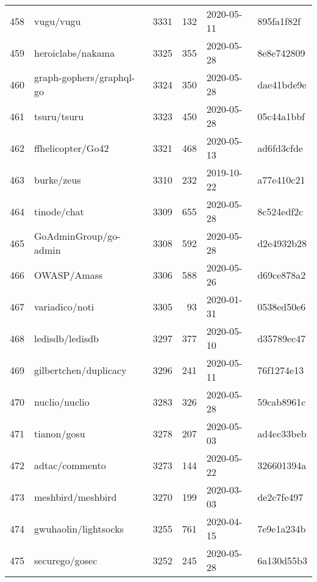 \begin{longtable}{llrrll}
    458 &                                          vugu/vugu &   3331 &    132 & 2020-05-11 &  895fa1f82f \\
    459 &                                  heroiclabs/nakama &   3325 &    355 & 2020-05-28 &  8e8e742809 \\
    460 &                           graph-gophers/graphql-go &   3324 &    350 & 2020-05-28 &  dae41bde9e \\
    461 &                                        tsuru/tsuru &   3323 &    450 & 2020-05-28 &  05c44a1bbf \\
    462 &                                  ffhelicopter/Go42 &   3321 &    468 & 2020-05-13 &  ad6fd3cfde \\
    463 &                                         burke/zeus &   3310 &    232 & 2019-10-22 &  a77e410c21 \\
    464 &                                        tinode/chat &   3309 &    655 & 2020-05-28 &  8c524edf2c \\
    465 &                              GoAdminGroup/go-admin &   3308 &    592 & 2020-05-28 &  d2e4932b28 \\
    466 &                                        OWASP/Amass &   3306 &    588 & 2020-05-26 &  d69ce878a2 \\
    467 &                                     variadico/noti &   3305 &     93 & 2020-01-31 &  0538ed50e6 \\
    468 &                                    ledisdb/ledisdb &   3297 &    377 & 2020-05-10 &  d35789ec47 \\
    469 &                              gilbertchen/duplicacy &   3296 &    241 & 2020-05-11 &  76f1274e13 \\
    470 &                                      nuclio/nuclio &   3283 &    326 & 2020-05-28 &  59cab8961c \\
    471 &                                        tianon/gosu &   3278 &    207 & 2020-05-03 &  ad4ec33beb \\
    472 &                                     adtac/commento &   3273 &    144 & 2020-05-22 &  326601394a \\
    473 &                                  meshbird/meshbird &   3270 &    199 & 2020-03-03 &  de2c7fe497 \\
    474 &                               gwuhaolin/lightsocks &   3255 &    761 & 2020-04-15 &  7e9e1a234b \\
    475 &                                     securego/gosec &   3252 &    245 & 2020-05-28 &  6a130d55b3 \\

\end{longtable}
